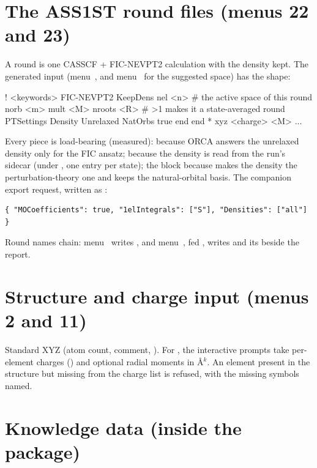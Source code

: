 \section{The ASS1ST round files (menus 22 and 23)}

A round is one CASSCF + FIC-NEVPT2 calculation with the density kept.  The
generated input (menu~, and menu~ for the suggested space)
has the shape:

\begin{codeblock}
! <keywords> FIC-NEVPT2 KeepDens
  nel <n>          # the active space of this round
  norb <m>
  mult <M>
  nroots <R>       # >1 makes it a state-averaged round
  PTSettings
    Density Unrelaxed
    NatOrbs true
  end
end
* xyz <charge> <M>
...
\end{codeblock}

Every piece is load-bearing (measured):  because ORCA answers
the unrelaxed density only for the FIC ansatz;  because the
density is read from the run's  sidecar (under
, one entry per state); the
 block because  makes the density the
perturbation-theory one and  keeps the natural-orbital
basis.  The companion export request, written as :

\begin{lstlisting}[style=fbkcode]
{ "MOCoefficients": true, "1elIntegrals": ["S"], "Densities": ["all"] }
\end{lstlisting}

Round names chain: menu~ writes , and
menu~, fed , writes 
and its  beside the report.

\section{Structure and charge input (menus 2 and 11)}

Standard XYZ (atom count, comment, ). For , the
interactive prompts take per-element charges () and optional
radial moments  in \AA$^k$. An element present in the structure
but missing from the charge list is refused, with the missing symbols named.

\section{Knowledge data (inside the package)}

